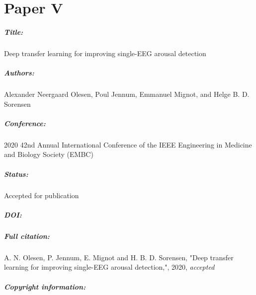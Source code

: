 \chapter{Paper V}

\paragraph{Title:}
Deep transfer learning for improving single-EEG arousal detection

\paragraph{Authors:}
Alexander Neergaard Olesen, Poul Jennum, Emmanuel Mignot, and Helge B. D. Sorensen

\paragraph{Conference:}
2020 42nd Annual International Conference of the IEEE Engineering in Medicine and Biology Society (EMBC)

\paragraph{Status:}
Accepted for publication

\paragraph{DOI:}


\paragraph{Full citation:}
A. N. Olesen, P. Jennum, E. Mignot and H. B. D. Sorensen, "Deep transfer learning for improving single-EEG arousal detection,", 2020, \textit{accepted}

\paragraph{Copyright information:}


